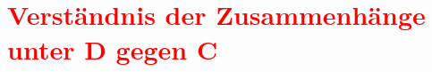 \section[Verständnis der Zusammenhänge unter D gegen C]{\textcolor{red}{Verständnis der Zusammenhänge unter D gegen C}}%
\label{sec:verstaendniszuwachs}

